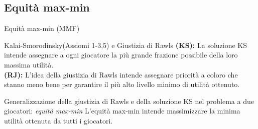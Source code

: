 \documentclass{beamer}
\begin{document}
	
	\subsection{Equità max-min}
	
	\begin{frame}{Equità max-min (MMF)}
		\begin{block}{Kalai-Smorodinsky(Assiomi 1-3,5) e Giustizia di Rawls}
			\textbf{(KS):} La soluzione KS intende assegnare a ogni giocatore la più grande frazione possibile della loro massima utilità.\\
		\textbf{(RJ):} L'idea della giustizia di Rawls intende assegnare priorità a coloro che stanno meno bene per garantire il più alto livello minimo di utilità ottenuto.
	\end{block}
	\begin{block}{Generalizzazione della giustizia di Rawls e della soluzione KS nel problema a due giocatori: \textit{equità max-min} }
		L'equità max-min intende massimizzare la minima utilità ottenuta da tutti i giocatori.
	\end{block}
\end{frame}
\end{document}
